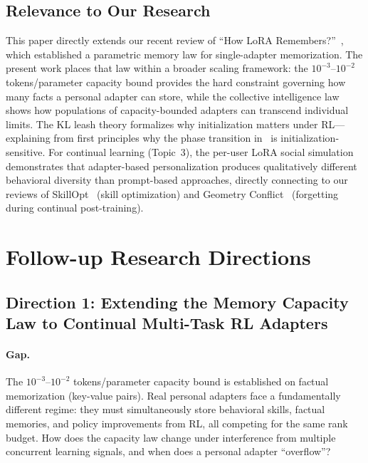 \documentclass[11pt,a4paper]{article}
\begin{document}
\subsection{Relevance to Our Research}

This paper directly extends our recent review of ``How LoRA Remembers?''~\cite{xu2026lora}, which established a parametric memory law for single-adapter memorization. The present work places that law within a broader scaling framework: the $10^{-3}$--$10^{-2}$ tokens/parameter capacity bound provides the hard constraint governing how many facts a personal adapter can store, while the collective intelligence law shows how populations of capacity-bounded adapters can transcend individual limits. The KL leash theory formalizes why initialization matters under RL---explaining from first principles why the phase transition in~\cite{xu2026lora} is initialization-sensitive. For continual learning (Topic~3), the per-user LoRA social simulation demonstrates that adapter-based personalization produces qualitatively different behavioral diversity than prompt-based approaches, directly connecting to our reviews of SkillOpt~\cite{skillopt2026} (skill optimization) and Geometry Conflict~\cite{geometry2026} (forgetting during continual post-training).

\section{Follow-up Research Directions}

\subsection{Direction 1: Extending the Memory Capacity Law to Continual Multi-Task RL Adapters}

\paragraph{Gap.} The $10^{-3}$--$10^{-2}$ tokens/parameter capacity bound is established on factual memorization (key-value pairs). Real personal adapters face a fundamentally different regime: they must simultaneously store behavioral skills, factual memories, and policy improvements from RL, all competing for the same rank budget. How does the capacity law change under interference from multiple concurrent learning signals, and when does a personal adapter ``overflow''?
\end{document}
